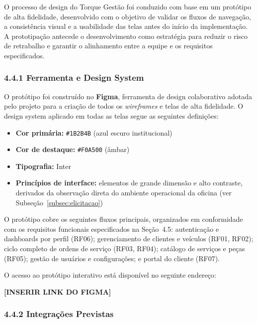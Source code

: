 \documentclass[12pt, a4paper]{article}
\begin{document}
O processo de design do Torque Gest\~ao foi conduzido com base em um prot\'otipo de alta
fidelidade, desenvolvido com o objetivo de validar os fluxos de navega\c{c}\~ao, a
consist\^encia visual e a usabilidade das telas antes do in\'icio da implementa\c{c}\~ao.
A prototipa\c{c}\~ao antecede o desenvolvimento como estrat\'egia para reduzir o risco de
retrabalho e garantir o alinhamento entre a equipe e os requisitos especificados.

\subsubsection*{4.4.1 Ferramenta e Design System}

O prot\'otipo foi constru\'ido no \textbf{Figma}, ferramenta de design colaborativo adotada
pelo projeto para a cria\c{c}\~ao de todos os \textit{wireframes} e telas de alta fidelidade.
O design system aplicado em todas as telas segue as seguintes defini\c{c}\~oes:

\begin{itemize}[leftmargin=2cm, itemsep=4pt]
  \item \textbf{Cor prim\'aria:} \texttt{\#1B2B4B} (azul escuro institucional)
  \item \textbf{Cor de destaque:} \texttt{\#F0A500} (âmbar)
  \item \textbf{Tipografia:} Inter
  \item \textbf{Princ\'ipios de interface:} elementos de grande dimens\~ao e alto contraste,
        derivados da observa\c{c}\~ao direta do ambiente operacional da oficina (ver
        Subse\c{c}\~ao~\ref{subsec:elicitacao})
\end{itemize}

O prot\'otipo cobre os seguintes fluxos principais, organizados em conformidade com os
requisitos funcionais especificados na Se\c{c}\~ao~4.5: autentica\c{c}\~ao e dashboards
por perfil (RF06); gerenciamento de clientes e ve\'iculos (RF01, RF02); ciclo completo
de ordens de servi\c{c}o (RF03, RF04); cat\'alogo de servi\c{c}os e pe\c{c}as (RF05);
gest\~ao de usu\'arios e configura\c{c}\~oes; e portal do cliente (RF07).

O acesso ao prot\'otipo interativo est\'a dispon\'ivel no seguinte endere\c{c}o:

\begin{center}
  \textbf{[INSERIR LINK DO FIGMA]}
\end{center}

\subsubsection*{4.4.2 Integrações Previstas}
\end{document}
